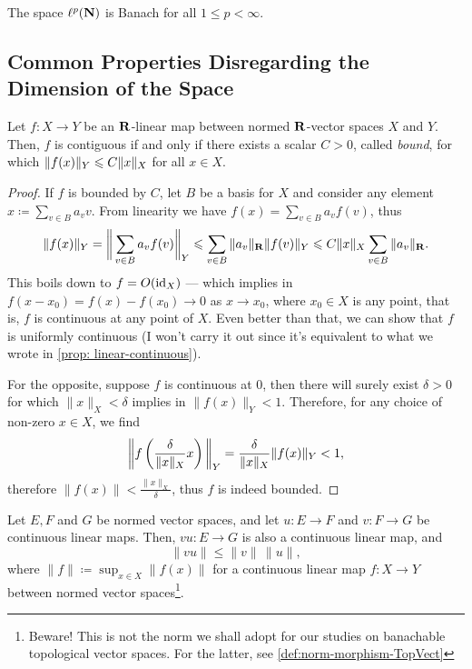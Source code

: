 \begin{proposition}
    \label{prop:ell-p-is-banach}
    The space \(\ell^p(\mathbf{N})\) is Banach for all \(1 \leq p < \infty\).
\end{proposition}


\subsection{Common Properties Disregarding the Dimension of the Space}

\begin{proposition}
    \label{prop:continous-linear-thus-bounded}
    Let \(f: X \to Y\) be an \(\mathbf{R}\)-linear map between normed \(\mathbf{R}\)-vector spaces
    \(X\) and \(Y\). Then, \(f\) is contiguous if and only if there exists a scalar
    \(C > 0\), called \emph{bound}, for which \(\lVert f(x)\rVert_Y \leqslant C \lVert x\rVert_{X}\)
    for all \(x \in X\).
\end{proposition}

\begin{proof}
    If \(f\) is bounded by \(C\), let \(B\) be a basis for \(X\) and consider any
    element \(x \coloneq \sum_{v \in B} a_{v} v\). From linearity we have \(f(x) =
    \sum_{v \in B} a_v f(v)\), thus
    \[
        \| f(x) \|_Y = \bigg\| \sum_{v \in B} a_v f(v) \bigg\|_{Y}
        \leqslant \sum_{v \in B} \| a_v \|_{\mathbf{R}} \| f(v) \|_{Y}
        \leqslant C \|x\|_{X} \sum_{v \in B} \|a_v\|_{\mathbf{R}}.
    \]
    This boils down to \(f = O(\operatorname{id}_{X})\) --- which implies in \(f(x - x_0) = f(x) -
    f(x_0) \to 0\) as \(x \to x_0\), where \(x_0 \in X\) is any point, that is,
    \(f\) is continuous at any point of \(X\). Even better than that, we can show
    that \(f\) is uniformly continuous (I won't carry it out since it's equivalent to
    what we wrote in \cref{prop: linear-continuous}).

    For the opposite, suppose \(f\) is continuous at \(0\), then there will surely
    exist \(\delta > 0\) for which \(\|x\|_X < \delta\) implies in
    \(\|f(x)\|_Y < 1\). Therefore, for any choice of non-zero \(x \in X\), we
    find
    \[
        \bigg\| f \left( \frac{\delta}{\lVert x\rVert_X} x \right) \bigg\|_Y
        = \frac{\delta}{\| x \|_X} \| f(x) \|_{Y} < 1,
    \]
    therefore \(\| f(x) \| < \frac{\| x \|_{X}}{\delta}\), thus \(f\) is indeed
    bounded.
\end{proof}

\begin{proposition}
    \label{prop:composition-banach-morphisms}
    Let \(E, F\) and \(G\) be normed vector spaces, and let \(u: E \to F\) and \(v:
    F \to G\) be continuous linear maps. Then, \(v u: E \to G\) is also a continuous
    linear map, and
    \[
        \|v u\| \leq \|v\|\, \|u\|,
    \]
    where \(\|f\| \coloneq \sup_{x \in X} \|f(x)\|\) for a continuous linear
    map \(f: X \to Y\) between normed vector spaces\footnote{Beware! This is not the
        norm we shall adopt for our studies on banachable topological vector spaces. For
        the latter, see \cref{def:norm-morphism-TopVect}}.
\end{proposition}


